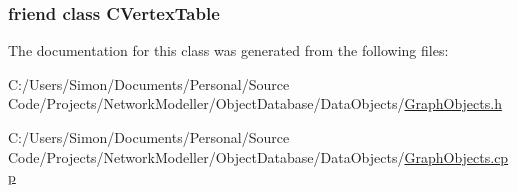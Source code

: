 \subsubsection[{C\+Vertex\+Table}]{\setlength{\rightskip}{0pt plus 5cm}friend class {\bf C\+Vertex\+Table}\hspace{0.3cm}{\ttfamily [friend]}}\label{class_c_vertex_a1d86cbedc9bc2eb368c4ef78ee139e3d}


The documentation for this class was generated from the following files\+:\begin{DoxyCompactItemize}
\item 
C\+:/\+Users/\+Simon/\+Documents/\+Personal/\+Source Code/\+Projects/\+Network\+Modeller/\+Object\+Database/\+Data\+Objects/\hyperlink{_graph_objects_8h}{Graph\+Objects.\+h}\item 
C\+:/\+Users/\+Simon/\+Documents/\+Personal/\+Source Code/\+Projects/\+Network\+Modeller/\+Object\+Database/\+Data\+Objects/\hyperlink{_graph_objects_8cpp}{Graph\+Objects.\+cpp}\end{DoxyCompactItemize}
